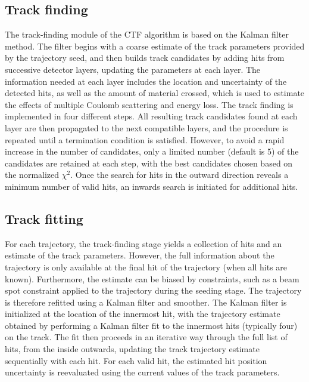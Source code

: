 \subsection{Track finding}
The track-finding module of the CTF algorithm is based on the Kalman filter method. The filter begins with a coarse estimate of the track parameters provided by the trajectory seed, and then builds track candidates by adding hits from successive detector layers, updating the parameters at each layer. The information needed at each layer includes the location and uncertainty of the detected hits, as well as the amount of material crossed, which is used to estimate the effects of multiple Coulomb scattering and energy loss. The track finding is implemented in four different steps. All resulting track candidates found at each layer are then propagated to the next compatible layers, and the procedure is repeated until a termination condition is satisfied. However, to avoid a rapid increase in the number of candidates, only a limited number (default is 5) of the candidates are retained at each step, with the best candidates chosen based on the normalized $\chi^2$. Once the search for hits in the outward direction reveals a minimum number of valid hits, an inwards search is initiated for additional hits.
\subsection{Track fitting}
For each trajectory, the track-finding stage yields a collection of hits and an estimate of the track parameters. However, the full information about the trajectory is only available at the final hit of the trajectory (when all hits are known). Furthermore, the estimate can be biased by constraints, such as a beam spot constraint applied to the trajectory during the seeding stage. The trajectory is therefore refitted using a Kalman filter and smoother. The Kalman filter is initialized at the location of the innermost hit, with the trajectory estimate obtained by performing a Kalman filter fit to the innermost hits (typically four) on the track. The fit then proceeds in an iterative way through the full list of hits, from the inside outwards, updating the track trajectory estimate sequentially with each hit. For each valid hit, the estimated hit position uncertainty is reevaluated using the current values of the track parameters.
